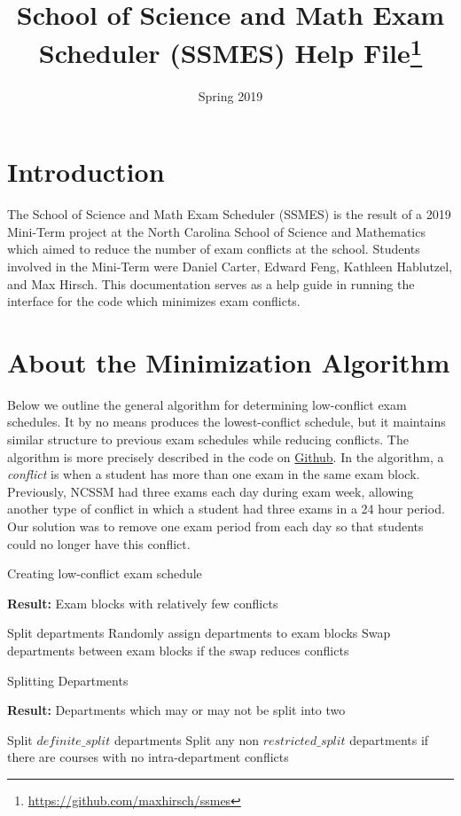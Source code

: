 \documentclass[12pt]{article}
\title{School of Science and Math Exam Scheduler (SSMES) Help File\footnote{\url{https://github.com/maxhirsch/ssmes}}}
\date{Spring 2019}
\begin{document}
\maketitle
\tableofcontents
\newpage

\section{Introduction}
The School of Science and Math Exam Scheduler (SSMES) is the result of a 2019 Mini-Term project at the North Carolina School of Science and Mathematics which aimed to reduce the number of exam conflicts at the school. Students involved in the Mini-Term were Daniel Carter, Edward Feng, Kathleen Hablutzel, and Max Hirsch. This documentation serves as a help guide in running the interface for the code which minimizes exam conflicts.

\section{About the Minimization Algorithm}
Below we outline the general algorithm for determining low-conflict exam schedules. It by no means produces the lowest-conflict schedule, but it maintains similar structure to previous exam schedules while reducing conflicts. The algorithm is more precisely described in the code on \href{https://github.com/maxhirsch/ssmes}{Github}. In the algorithm, a \textit{conflict} is when a student has more than one exam in the same exam block. Previously, NCSSM had three exams each day during exam week, allowing another type of conflict in which a student had three exams in a 24 hour period. Our solution was to remove one exam period from each day so that students could no longer have this conflict.
\begin{algorithm}
	\caption{Creating low-conflict exam schedule}
	\textbf{Result:} Exam blocks with relatively few conflicts
	\begin{algorithmic}[1]
			\State Split departments
			\State Randomly assign departments to exam blocks
			\Do
				\State Swap departments between exam blocks if the swap reduces conflicts
		\EndFor
		\EndProcedure
	\end{algorithmic}
\end{algorithm}

\begin{algorithm}
	\label{alg:split}
	\caption{Splitting Departments}
	\textbf{Result:} Departments which may or may not be split into two
	\begin{algorithmic}[1]
			\State Split $definite\_split$ departments
			\State Split any non $restricted\_split$ departments if there are courses with no intra-department conflicts
		\EndFor
		\EndProcedure
	\end{algorithmic}
\end{algorithm}
\end{document}
